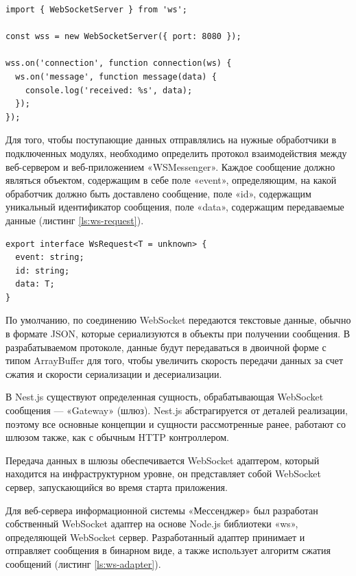\begin{lstlisting}[caption={Создание веб-сокет сервера}, label={ls:ws-server-create}]
import { WebSocketServer } from 'ws';

const wss = new WebSocketServer({ port: 8080 });

wss.on('connection', function connection(ws) {
  ws.on('message', function message(data) {
    console.log('received: %s', data);
  });
});
\end{lstlisting}

Для того, чтобы поступающие данных отправлялись на нужные обработчики в подключенных модулях, необходимо определить протокол взаимодействия между веб-сервером и веб-приложением «WSMessenger». Каждое сообщение должно являться объектом, содержащим в себе поле «event», определяющим, на какой обработчик должно быть доставлено сообщение, поле «id», содержащим уникальный идентификатор сообщения, поле «data», содержащим передаваемые данные (листинг \ref{ls:ws-request}).

\begin{lstlisting}[caption={Структура WebSocket запроса}, label={ls:ws-request}]
export interface WsRequest<T = unknown> {
  event: string;
  id: string;
  data: T;
}
\end{lstlisting}

По умолчанию, по соединению WebSocket передаются текстовые данные, обычно в формате JSON, которые сериализуются в объекты при получении сообщения. В разрабатываемом протоколе, данные будут передаваться в двоичной форме с типом ArrayBuffer для того, чтобы увеличить скорость передачи данных за счет сжатия и скорости сериализации и десериализации.

В Nest.js существуют определенная сущность, обрабатывающая WebSocket сообщения — «Gateway» (шлюз). Nest.js абстрагируется от деталей реализации, поэтому все основные концепции и сущности рассмотренные ранее, работают со шлюзом также, как с обычным HTTP контроллером.

Передача данных в шлюзы обеспечивается WebSocket адаптером, который находится на инфраструктурном уровне, он представляет собой WebSocket сервер, запускающийся во время старта приложения.

Для веб-сервера информационной системы «Мессенджер» был разработан собственный WebSocket адаптер на основе Node.js библиотеки «ws», определяющей WebSocket сервер. Разработанный адаптер принимает и отправляет сообщения в бинарном виде, а также использует алгоритм сжатия сообщений (листинг \ref{ls:ws-adapter}).

